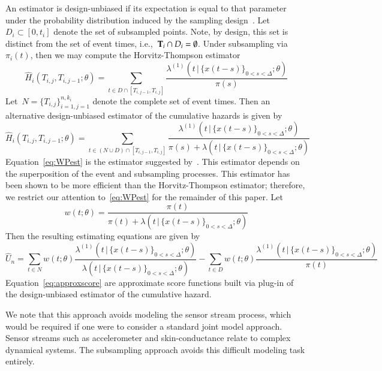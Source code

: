 \documentclass[11pt]{amsart}
\def\given{\, | \,}
\def\bfT{{\bf T}}
\begin{document}
An estimator is design-unbiased if its expectation is equal to that
parameter under the probability distribution induced by the sampling
design~\citep{Cassel1977}. Let~$D_i \subset [0,t_i]$ denote the set of
subsampled points.  Note, by design, this set is distinct from the set
of event times, i.e.,~$\bfT_i \cap D_i = \emptyset$.  Under
subsampling via $\pi_i (t)$, then we may compute the Horvitz-Thompson
estimator 
\[
\hat H_{i} (T_{i,j}, T_{i,j-1}; \theta) = \sum_{t \in D \cap [T_{i,j-1},
  T_{i,j}]} \frac{ \lambda^{(1)} ( t \given \{ x(t - s) \}_{0 < s <
    \Delta}; \theta ) }{ \pi (s) }
\]
Let~$N = \{ T_{i,j} \}_{i =1, j=1}^{n,k_i}$ denote the complete set of
event times.  Then an alternative design-unbiased estimator of the
cumulative hazards is given by
\begin{equation}
\label{eq:WPest}
\hat H_{i} (T_{i,j}, T_{i,j-1}; \theta) = \sum_{t \in (N \cup D) \cap [T_{i,j-1},
  T_{i,j}]} \frac{ \lambda^{(1)} ( t \given \{ x(t - s) \}_{0 < s <
    \Delta}; \theta ) }{ \pi (s) + \lambda ( t \given \{ x(t - s) \}_{0 < s <
    \Delta}; \theta) }
\end{equation}
Equation~\eqref{eq:WPest} is the estimator suggested
by~\cite{Waagepetersen2008}.  This estimator depends on the
superposition of the event and subsampling processes.  This estimator
has been shown to be more efficient than the Horvitz-Thompson
estimator; therefore, we restrict our attention to~\eqref{eq:WPest}
for the remainder of this paper. Let
\[
w (t; \theta) = \frac{\pi (t)}{\pi (t) + \lambda (t \given \{
  x(t - s) \}_{0 < s < \Delta}; \theta)}
\]
Then the resulting estimating equations are given by
\begin{equation}
\label{eq:approxscore}
\hat{U}_n = \sum_{t \in N} w(t; \theta) \frac{\lambda^{(1)} (t \given \{
  x(t - s) \}_{0 < s < \Delta}; \theta)}{ \lambda ( t \given \{
  x(t - s) \}_{0 < s < \Delta}; \theta)}  - 
\sum_{t \in D} w(t; \theta) \frac{\lambda^{(1)} (t \given \{
  x(t - s) \}_{0 < s < \Delta}; \theta)}{ \pi (t) }
\end{equation}
Equation~\eqref{eq:approxscore} are approximate score functions built
via plug-in of the design-unbiased estimator of the cumulative hazard.

We note that this approach avoids modeling the sensor stream process,
which would be required if one were to consider a standard joint model
approach.  Sensor streams such as accelerometer and skin-conductance
relate to complex dynamical systems.  The subsampling
approach avoids this difficult modeling task entirely.
\end{document}
